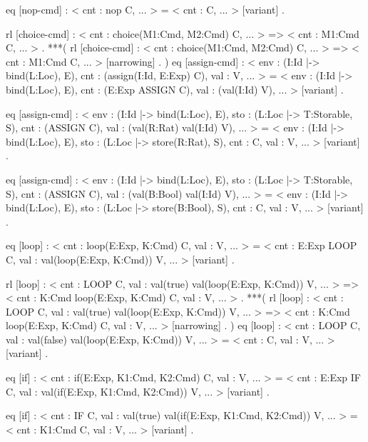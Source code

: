 \documentclass{llncs}%
\begin{document}
    eq [nop-cmd] :
        < cnt : nop C, ... > = < cnt : C, ... > [variant] .

    rl [choice-cmd] :
        < cnt : choice(M1:Cmd, M2:Cmd) C, ... > =>
        < cnt : M1:Cmd C, ... > .
***(
    rl [choice-cmd] :
        < cnt : choice(M1:Cmd, M2:Cmd) C, ... > =>
        < cnt : M1:Cmd C, ... > [narrowing] .
)
    eq [assign-cmd] :
        < env : (I:Id |-> bind(L:Loc), E),
          cnt : (assign(I:Id, E:Exp) C),
          val : V, ... > 
     =
        < env : (I:Id |-> bind(L:Loc), E),
          cnt : (E:Exp ASSIGN C),
          val : (val(I:Id) V), ... > [variant] .

    eq [assign-cmd] :
        < env : (I:Id |-> bind(L:Loc), E),
          sto : (L:Loc |-> T:Storable, S),
          cnt : (ASSIGN C),
          val : (val(R:Rat) val(I:Id) V), ... > 
     =
        < env : (I:Id |-> bind(L:Loc), E),
          sto : (L:Loc |-> store(R:Rat), S),
          cnt : C,
          val : V, ... > [variant] .

    eq [assign-cmd] :
        < env : (I:Id |-> bind(L:Loc), E),
          sto : (L:Loc |-> T:Storable, S),
          cnt : (ASSIGN C),
          val : (val(B:Bool) val(I:Id) V), ... > 
     =
        < env : (I:Id |-> bind(L:Loc), E),
          sto : (L:Loc |-> store(B:Bool), S),
          cnt : C,
          val : V, ... > [variant] .

    eq [loop] :
        < cnt : loop(E:Exp, K:Cmd) C, val : V, ... > 
     =
        < cnt : E:Exp LOOP C,
          val : val(loop(E:Exp, K:Cmd)) V, ... > [variant] .

    rl [loop] :
        < cnt : LOOP C,
          val : val(true) val(loop(E:Exp, K:Cmd)) V, ... > 
    =>
        < cnt : K:Cmd loop(E:Exp, K:Cmd) C,
          val : V, ... > .
***(
    rl [loop] :
        < cnt : LOOP C,
          val : val(true) val(loop(E:Exp, K:Cmd)) V, ... > =>
        < cnt : K:Cmd loop(E:Exp, K:Cmd) C,
          val : V, ... > [narrowing] .
)
    eq [loop] :
        < cnt : LOOP C,
          val : val(false) val(loop(E:Exp, K:Cmd)) V, ... > 
     =
        < cnt : C, val : V, ... > [variant] .

    eq [if] :
       < cnt : if(E:Exp, K1:Cmd, K2:Cmd) C, val : V, ... > 
     =
       < cnt : E:Exp IF C,
         val : val(if(E:Exp, K1:Cmd, K2:Cmd)) V, ... > [variant] .

    eq [if] :
       < cnt : IF C,
         val : val(true) val(if(E:Exp, K1:Cmd, K2:Cmd)) V, ... > 
     =
       < cnt : K1:Cmd C,
         val : V, ... > [variant] .
\end{document}
